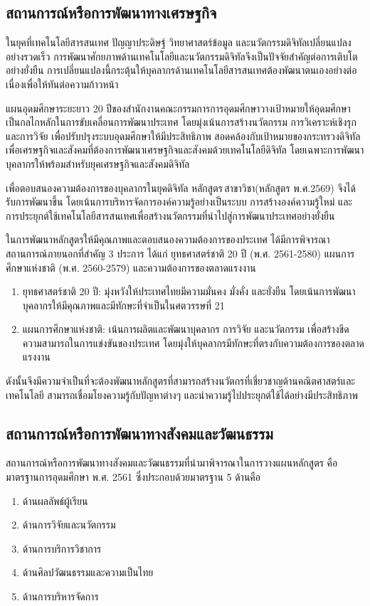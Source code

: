 {\subsection{สถานการณ์หรือการพัฒนาทางเศรษฐกิจ}
ในยุคที่เทคโนโลยีสารสนเทศ ปัญญาประดิษฐ์ วิทยาศาสตร์ข้อมูล และนวัตกรรมดิจิทัลเปลี่ยนแปลงอย่างรวดเร็ว การพัฒนาศักยภาพด้านเทคโนโลยีและนวัตกรรมดิจิทัลจึงเป็นปัจจัยสำคัญต่อการเติบโตอย่างยั่งยืน การเปลี่ยนแปลงนี้กระตุ้นให้บุคลากรด้านเทคโนโลยีสารสนเทศต้องพัฒนาตนเองอย่างต่อเนื่องเพื่อให้ทันต่อความก้าวหน้า

แผนอุดมศึกษาระยะยาว 20 ปีของสำนักงานคณะกรรมการการอุดมศึกษาวางเป้าหมายให้อุดมศึกษาเป็นกลไกหลักในการขับเคลื่อนการพัฒนาประเทศ โดยมุ่งเน้นการสร้างนวัตกรรม การวิเคราะห์เชิงรุก และการวิจัย เพื่อปรับปรุงระบบอุดมศึกษาให้มีประสิทธิภาพ สอดคล้องกับเป้าหมายของกระทรวงดิจิทัลเพื่อเศรษฐกิจและสังคมที่ต้องการพัฒนาเศรษฐกิจและสังคมด้วยเทคโนโลยีดิจิทัล โดยเฉพาะการพัฒนาบุคลากรให้พร้อมสำหรับยุคเศรษฐกิจและสังคมดิจิทัล

เพื่อตอบสนองความต้องการของบุคลากรในยุคดิจิทัล หลักสูตร\thdegree\,สาขาวิชา\thdegreebranch (หลักสูตร พ.ศ.2569) จึงได้รับการพัฒนาขึ้น โดยเน้นการบริหารจัดการองค์ความรู้อย่างเป็นระบบ การสร้างองค์ความรู้ใหม่ และการประยุกต์ใช้เทคโนโลยีสารสนเทศเพื่อสร้างนวัตกรรมที่นำไปสู่การพัฒนาประเทศอย่างยั่งยืน

ในการพัฒนาหลักสูตรให้มีคุณภาพและตอบสนองความต้องการของประเทศ ได้มีการพิจารณาสถานการณ์ภายนอกที่สำคัญ 3 ประการ ได้แก่ ยุทธศาสตร์ชาติ 20 ปี (พ.ศ. 2561-2580) แผนการศึกษาแห่งชาติ (พ.ศ. 2560-2579) และความต้องการของตลาดแรงงาน
\begin{enumerate}
	\item ยุทธศาสตร์ชาติ 20 ปี: มุ่งหวังให้ประเทศไทยมีความมั่นคง มั่งคั่ง และยั่งยืน โดยเน้นการพัฒนาบุคลากรให้มีคุณภาพและมีทักษะที่จำเป็นในศตวรรษที่ 21 
	\item แผนการศึกษาแห่งชาติ: เน้นการผลิตและพัฒนาบุคลากร การวิจัย และนวัตกรรม เพื่อสร้างขีดความสามารถในการแข่งขันของประเทศ โดยมุ่งให้บุคลากรมีทักษะที่ตรงกับความต้องการของตลาดแรงงาน
\end{enumerate}

ดังนั้นจึงมีความจำเป็นที่จะต้องพัฒนาหลักสูตรที่สามารถสร้างนวัตกรที่เชี่ยวชาญด้านคณิตศาสตร์และเทคโนโลยี สามารถเชื่อมโยงความรู้กับปัญหาต่างๆ และนำความรู้ไปประยุกต์ใช้ได้อย่างมีประสิทธิภาพ
\subsection{สถานการณ์หรือการพัฒนาทางสังคมและวัฒนธรรม}
สถานการณ์หรือการพัฒนาทางสังคมและวัฒนธรรมที่นำมาพิจารณาในการวางแผนหลักสูตร คือ มาตรฐานการอุดมศึกษา พ.ศ. 2561 ซึ่งประกอบด้วยมาตรฐาน 5 ด้านคือ
\begin{enumerate}[label=มาตรฐานที่ \arabic*, leftmargin=5\parindent]
	\item ด้านผลลัพธ์ผู้เรียน
	\item ด้านการวิจัยและนวัตกรรม
	\item ด้านการบริการวิชาการ
	\item ด้านศิลปวัฒนธรรมและความเป็นไทย
	\item ด้านการบริหารจัดการ
\end{enumerate}
		
}
